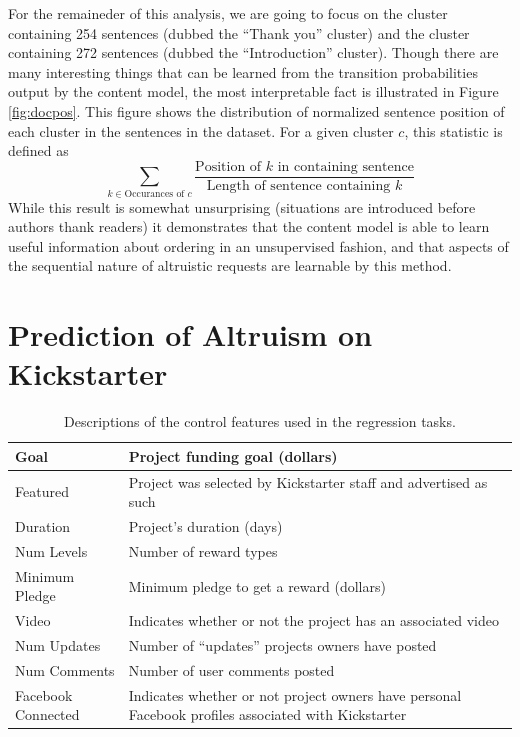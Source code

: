 \documentclass[letterpaper]{article}
\begin{document}
For the remaineder of this analysis, we are going to focus on the cluster containing 254 sentences (dubbed the ``Thank you'' cluster) and the cluster containing 272 sentences (dubbed the ``Introduction'' cluster). Though there are many interesting things that can be learned from the transition probabilities output by the content model, the most interpretable fact is illustrated in Figure \ref{fig:docpos}. This figure shows the distribution of normalized sentence position of each cluster in the sentences in the dataset. For a given cluster $c$, this statistic is defined as
\begin{equation} \label{eq:sentpos}
\sum\limits_{k \in \text{Occurances of $c$}} \frac{\text{Position of $k$ in containing sentence}}{\text{Length of sentence containing $k$}}
\end{equation}
While this result is somewhat unsurprising (situations are introduced before authors thank readers) it demonstrates that the content model is able to learn useful information about ordering in an unsupervised fashion, and that aspects of the sequential nature of altruistic requests are learnable by this method.

\section{Prediction of Altruism on Kickstarter}
\begin{table}
\centering
\begin{tabular}{|l|L{5cm}|}
\hline
Goal & Project funding goal (dollars) \\\hline
Featured & Project was selected by Kickstarter staff and advertised as such\\\hline
Duration & Project's duration (days) \\\hline
Num Levels & Number of reward types \\\hline
Minimum Pledge & Minimum pledge to get a reward (dollars)\\\hline
Video & Indicates whether or not the project has an associated video \\\hline
Num Updates & Number of ``updates'' projects owners have posted \\\hline
Num Comments & Number of user comments posted \\\hline
Facebook Connected & Indicates whether or not project owners have personal Facebook profiles associated with Kickstarter\\
\hline
\end{tabular}
\caption{Descriptions of the control features used in the regression tasks.}
\label{tab:controls}
\end{table}
\end{document}
